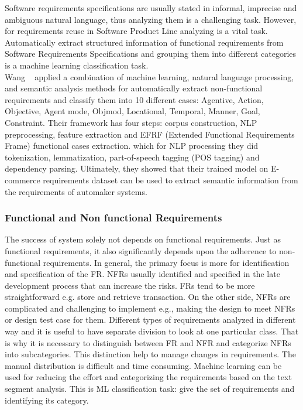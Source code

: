 Software requirements specifications are usually stated in informal, imprecise and ambiguous natural language, thus analyzing them is a challenging task. However, for requirements reuse in Software Product Line analyzing is a vital task. Automatically extract structured information of functional requirements from Software Requirements Specifications and grouping them into different categories is a machine learning classification task\cite{7949577}. \\

Wang \etal~\cite{7949577} applied a combination of machine learning, natural language processing, and semantic analysis methods for automatically extract non-functional requirements and classify them into 10 different cases: Agentive, Action, Objective, Agent mode, Objmod, Locational, Temporal, Manner, Goal, Constraint. Their framework has four steps: corpus construction,  NLP  preprocessing, feature extraction and  EFRF (Extended Functional Requirements Frame) functional cases extraction. which for NLP processing they did tokenization,   lemmatization, part-of-speech tagging (POS  tagging) and dependency parsing. Ultimately, they showed that their trained model on E-commerce requirements dataset can be used to extract semantic information from the requirements of automaker systems.

\subsubsection{Functional and Non functional Requirements}

The success of system solely not depends on functional requirements. Just as functional requirements, it also significantly depends upon the adherence to non-functional requirements. In general, the primary focus is more for identification and specification of the FR.  NFRs usually identified and specified in the late development process that can increase the risks. FRs tend to be more straightforward e.g. store and retrieve transaction. On the other side, NFRs are complicated and challenging to implement e.g., making the design to meet NFRs or design test case for them. Different types of requirements analyzed in different way and it is useful to have separate division to look at one particular class. That is why it is necessary to distinguish between FR and NFR and categorize NFRs into subcategories. This distinction help to manage changes in requirements. The manual distribution is difficult and time consuming. Machine learning can be used for reducing the effort and categorizing the requirements based on the text segment analysis. This is ML classification task: give the set of requirements and identifying its category. \\


